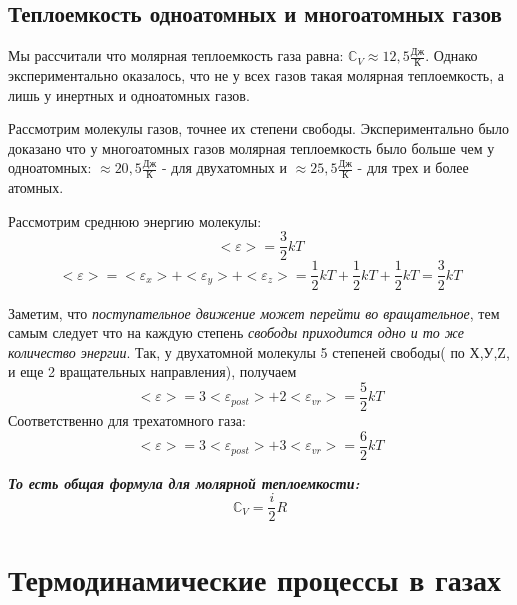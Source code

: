 \documentclass[../main.tex]{subfiles}
\begin{document}
\subsection{Теплоемкость одноатомных и многоатомных газов}
Мы рассчитали что молярная теплоемкость газа равна: $\mathbb{C}_V \approx 12,5 \frac{\text{Дж}}{\text{К}}$. Однако экспериментально оказалось, что не у всех газов такая молярная теплоемкость, а лишь у инертных и одноатомных газов.

\vspace{4px}

Рассмотрим молекулы газов, точнее их степени свободы. Экспериментально было доказано что у многоатомных газов молярная теплоемкость было больше чем у одноатомных: $\approx 20,5 \frac{\text{Дж}}{\text{К}}$ - для двухатомных и $\approx 25,5 \frac{\text{Дж}}{\text{К}}$ - для трех и более атомных.

\vspace{4px}

Рассмотрим среднюю энергию молекулы:
\[ <\varepsilon> = \frac{3}{2}kT \]
\[<\varepsilon> = <\varepsilon_x>+<\varepsilon_y>+<\varepsilon_z> = \frac{1}{2}kT + \frac{1}{2}kT+ \frac{1}{2}kT = \frac{3}{2}kT\]

Заметим, что \textit{поступательное движение может перейти во вращательное}, тем самым следует что на каждую степень \textit{свободы приходится одно и то же количество энергии}. Так, у двухатомной молекулы 5 степеней свободы( по Х,У,Z, и еще 2 вращательных направления), получаем
\[<\varepsilon> = 3<\varepsilon_{post}>+ 2<\varepsilon_{vr}> = \frac{5}{2}kT\]
Соответственно для трехатомного газа:
\[<\varepsilon> = 3<\varepsilon_{post}>+ 3<\varepsilon_{vr}> = \frac{6}{2}kT\]

\vspace{5px}

\textbf{\textit{То есть общая формула для молярной теплоемкости:}}
\[ \mathbb{C}_V = \frac{i}{2}R\]

\section{Термодинамические процессы в газах}
\end{document}
